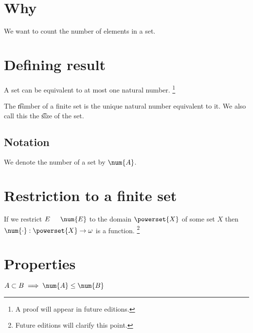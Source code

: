 
\section*{Why}

We want to count the number of elements in a set.

\section*{Defining result}

\begin{proposition}
A set can be equivalent to at most one natural number.
  \ifhmode\unskip\fi\footnote{
A proof will appear in future editions.
  }\end{proposition}
The \t{number} of a finite set is the unique natural number equivalent to it.
We also call this the \t{size} of the set.



\subsection*{Notation}

We denote the number of a set by $\num{A}$.

\section*{Restriction to a finite set}

If we restrict $E \indent \num{E}$ to the domain $\powerset{X}$ of some set $X$ then $\num{\cdot }: \powerset{X} \to \omega $ is a function.
    \ifhmode\unskip\fi\footnote{
Future editions will clarify this point.
    }

\section*{Properties}

\begin{proposition}
$A \subset B \implies \num{A} \leq \num{B}$\end{proposition}

\blankpage